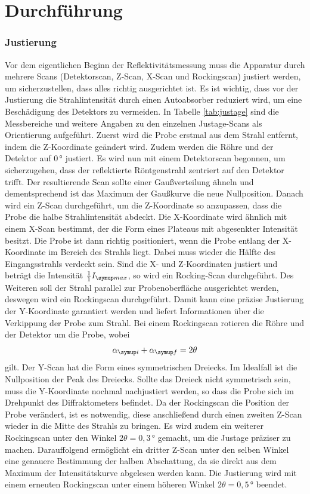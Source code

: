 \section{Durchführung}
\subsubsection{Justierung}
Vor dem eigentlichen Beginn der Reflektivitätsmessung muss die Apparatur durch mehrere Scans 
(Detektorscan, Z-Scan, X-Scan und Rockingscan) justiert werden, 
um sicherzustellen, dass alles richtig ausgerichtet ist.
Es ist wichtig, dass vor der Justierung die Strahlintensität durch einen Autoabsorber reduziert wird, um 
eine Beschädigung des Detektors zu vermeiden.
In Tabelle \ref{tab:justage} sind die Messbereiche und weitere Angaben zu den einzelnen Justage-Scans als Orientierung aufgeführt.
Zuerst wird die Probe erstmal aus dem Strahl entfernt, indem die Z-Koordinate geändert wird. Zudem werden die 
Röhre und der Detektor auf 0\,° justiert.
Es wird nun mit einem Detektorscan begonnen, um sicherzugehen, dass der reflektierte Röntgenstrahl zentriert auf den Detektor trifft.
Der resultierende Scan sollte einer Gaußverteilung ähneln und dementsprechend ist das Maximum der Gaußkurve die neue Nullposition.
Danach wird ein Z-Scan durchgeführt, um die Z-Koordinate so anzupassen, dass die Probe die halbe Strahlintensität abdeckt.
Die X-Koordinate wird ähnlich mit einem X-Scan bestimmt, der die Form eines Plateaus mit abgesenkter Intensität besitzt. 
Die Probe ist dann richtig positioniert, wenn die Probe entlang der X-Koordinate 
im Bereich des Strahls liegt. Dabei muss wieder die Hälfte des Eingangsstrahls verdeckt sein.
Sind die X- und Z-Koordinaten justiert und beträgt die Intensität $\frac{1}{1} I\idx{max}$, so wird ein Rocking-Scan durchgeführt.
Des Weiteren soll der Strahl parallel zur Probenoberfläche ausgerichtet werden, deswegen wird ein Rockingscan durchgeführt.
Damit kann eine präzise Justierung der Y-Koordinate garantiert werden und liefert Informationen über die Verkippung der Probe 
zum Strahl. Bei einem Rockingscan rotieren die Röhre und der Detektor um die Probe, wobei 
\begin{equation*}
  \alpha\idx{i} + \alpha\idx{f}= 2\theta
\end{equation*}
gilt. Der Y-Scan hat die Form eines symmetrischen Dreiecks. Im Idealfall ist die Nullposition der Peak des Dreiecks.
Sollte das Dreieck nicht symmetrisch sein, muss die Y-Koordinate nochmal nachjustiert werden, so dass die Probe sich im Drehpunkt 
des Diffraktometers befindet. Da der Rockingscan die Position der Probe verändert, 
ist es notwendig, diese anschließend durch einen zweiten Z-Scan wieder in die Mitte des Strahls zu bringen.
Es wird zudem ein weiterer Rockingscan unter den Winkel $2\theta=0,3\,°$ gemacht, um die Justage präziser zu machen.
Darauffolgend ermöglicht ein dritter Z-Scan unter den selben Winkel eine genauere Bestimmung der halben Abschattung, 
da sie direkt aus dem Maximum der Intensitätskurve abgelesen werden kann.
Die Justierung wird mit einem erneuten Rockingscan unter einem höheren Winkel $2\theta=0,5\,°$ beendet.

